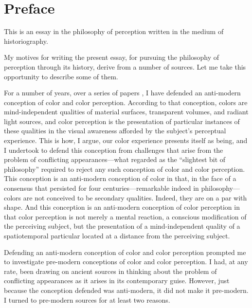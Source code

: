 \chapter*{Preface} %
\label{cha:preface}


This is an essay in the philosophy of perception written in the medium of historiography. 

My motives for writing the present essay, for pursuing the philosophy of perception through its history, derive from a number of sources. Let me take this opportunity to describe some of them.

For a number of years, over a series of papers \citep{Kalderon:2006tg,Kalderon:2008fk,Kalderon:2010fj,Kalderon:2007mr,Kalderon:2011fk}, I have defended an anti-modern conception of color and color perception. According to that conception, colors are mind-independent qualities of material surfaces, transparent volumes, and radiant light sources, and color perception is the presentation of particular instances of these qualities in the visual awareness afforded by the subject's perceptual experience. This is how, I argue, our color experience presents itself as being, and I undertook to defend this conception from challenges that arise from the problem of conflicting appearances---what \citet{Hume:1748zr} regarded as the ``slightest bit of philosophy'' required to reject any such conception of color and color perception. This conception is an anti-modern conception of color in that, in the face of a consensus that persisted for four centuries---remarkable indeed in philosophy---colors are not conceived to be secondary qualities. Indeed, they are on a par with shape. And this conception is an anti-modern conception of color perception in that color perception is not merely a mental reaction, a conscious modification of the perceiving subject, but the presentation of a mind-independent quality of a spatiotemporal particular located at a distance from the perceiving subject. 

Defending an anti-modern conception of color and color perception prompted me to investigate pre-modern conceptions of color and color perception. I had, at any rate, been drawing on ancient sources in thinking about the problem of conflicting appearances as it arises in its contemporary guise. However, just because the conception defended was anti-modern, it did not make it pre-modern. I turned to pre-modern sources for at least two reasons. 

